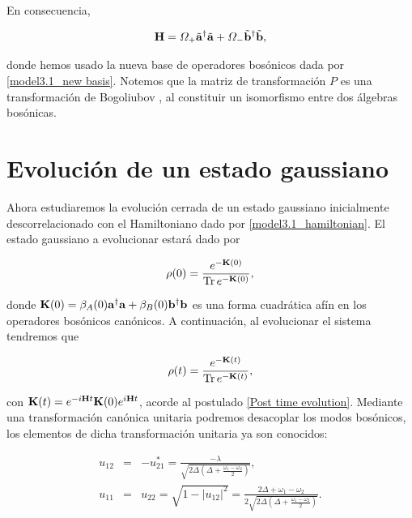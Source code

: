 \documentclass{report} %
\numberwithin{equation}{section}
\begin{document}
En consecuencia, 

\begin{equation}
    \mathbf{H} = \Omega_+ \tilde{\bf a}^{\dagger}\tilde{\bf a} + \Omega_- \tilde{\mathbf b}^{\dagger}\tilde{\mathbf b},
\end{equation}

donde hemos usado la nueva base de operadores bosónicos dada por \eqref{model3.1_new basis}. Notemos que la matriz de transformación $P$ es una transformación de Bogoliubov \cite{Nielsen.00}, al constituir un isomorfismo entre dos álgebras bosónicas.

\clearpage

\section{Evoluci\'on de un estado gaussiano}
\label{chap3_dingauss}

Ahora estudiaremos la evolución cerrada de un estado gaussiano inicialmente descorrelacionado con el Hamiltoniano dado por \eqref{model3.1_hamiltonian}. El estado gaussiano a evolucionar estará dado por

\begin{equation}
    \rho(0) = \frac{e^{-{\bf K}(0)}}{\Tr e^{-{\bf K}(0)}},
\end{equation}

donde ${\bf K}(0) = \beta_{A}(0){\bf a}^{\dagger} {\bf a} + \beta_{B}(0) {\mathbf b}^{\dagger}{\mathbf b}$ es una forma cuadrática afín en los operadores bosónicos canónicos. A continuación, al evolucionar el sistema tendremos que

\begin{equation}
    \rho(t) = \frac{e^{-{\bf K}(t)}}{\Tr e^{-{\bf K}(t)}},
\end{equation}

con ${\bf K} (t) = e^{-i{\bf H}t} {\bf K}(0)e^{i{\bf H}t}$, acorde al postulado \ref{Post time evolution}. Mediante una transformación canónica unitaria podremos desacoplar los modos bosónicos, los elementos de dicha transformación unitaria ya son conocidos:

\begin{eqnarray*}
  u_{12}&=&-u_{21}^*= \frac{-\lambda}{\sqrt{2 \Delta (\Delta +\frac{\omega_1-\omega_2}{2})}},\\
  u_{11}&=&u_{22}=\sqrt{1-|u_{12}|^2}=\frac{2\Delta+\omega_1-\omega_2}{2\sqrt{2 \Delta  (\Delta  +\frac{\omega_1-\omega_2}{2})}}.
\end{eqnarray*}
\end{document}
